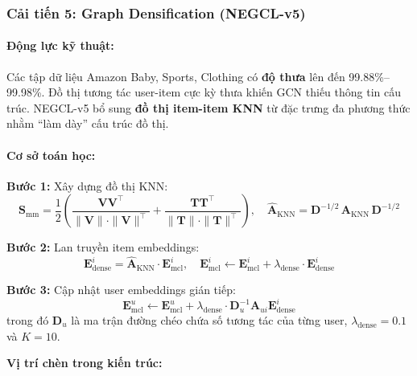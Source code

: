 \subsubsection{Cải tiến 5: Graph Densification (NEGCL-v5)}

\paragraph{Động lực kỹ thuật:}
Các tập dữ liệu Amazon Baby, Sports, Clothing có \textbf{độ thưa} lên đến 99.88\%--99.98\%. Đồ thị tương tác user-item cực kỳ thưa khiến GCN thiếu thông tin cấu trúc. NEGCL-v5 bổ sung \textbf{đồ thị item-item KNN} từ đặc trưng đa phương thức nhằm ``làm dày'' cấu trúc đồ thị.

\paragraph{Cơ sở toán học:}

\textbf{Bước 1:} Xây dựng đồ thị KNN:
\begin{equation}
\mathbf{S}_{\text{mm}} = \frac{1}{2}\left(\frac{\mathbf{V}\mathbf{V}^\top}{\|\mathbf{V}\| \cdot \|\mathbf{V}\|^\top} + \frac{\mathbf{T}\mathbf{T}^\top}{\|\mathbf{T}\| \cdot \|\mathbf{T}\|^\top}\right), \quad
\hat{\mathbf{A}}_{\text{KNN}} = \mathbf{D}^{-1/2}\, \mathbf{A}_{\text{KNN}}\, \mathbf{D}^{-1/2}
\end{equation}

\textbf{Bước 2:} Lan truyền item embeddings:
\begin{equation}
\mathbf{E}^{i}_{\text{dense}} = \hat{\mathbf{A}}_{\text{KNN}} \cdot \mathbf{E}^{i}_{\text{mcl}}, \quad
\mathbf{E}^{i}_{\text{mcl}} \leftarrow \mathbf{E}^{i}_{\text{mcl}} + \lambda_{\text{dense}} \cdot \mathbf{E}^{i}_{\text{dense}}
\end{equation}

\textbf{Bước 3:} Cập nhật user embeddings gián tiếp:
\begin{equation}
\mathbf{E}^{u}_{\text{mcl}} \leftarrow \mathbf{E}^{u}_{\text{mcl}} + \lambda_{\text{dense}} \cdot \mathbf{D}_{u}^{-1}\mathbf{A}_{ui}\mathbf{E}^{i}_{\text{dense}}
\end{equation}
trong đó $\mathbf D_u$ là ma trận đường chéo chứa số tương tác của từng user, $\lambda_{\text{dense}} = 0.1$ và $K = 10$.

\par\medskip
\noindent\textbf{Vị trí chèn trong kiến trúc:}\par
\nopagebreak[4]

